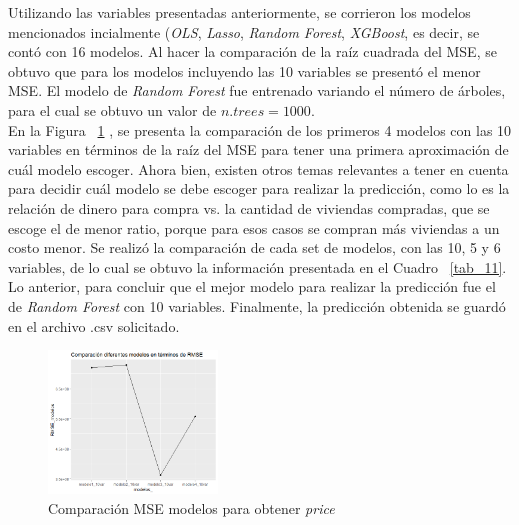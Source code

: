 \documentclass[conference, 10pt]{IEEEtran}
\begin{document}
Utilizando las variables presentadas anteriormente, se corrieron los modelos mencionados incialmente (\textit{OLS}, \textit{Lasso}, \textit{Random Forest}, \textit{XGBoost}, es decir, se contó con 16 modelos. Al hacer la comparación de la raíz cuadrada del MSE, se obtuvo que para los modelos incluyendo las 10 variables se presentó el menor MSE. El modelo de \textit{Random Forest} fue entrenado variando el número de árboles, para el cual se obtuvo un valor de $n.trees=1000$.\\
En la Figura ~\ref{fig_3} , se presenta la comparación de los primeros 4 modelos con las 10 variables en términos de la raíz del MSE para tener una primera aproximación de cuál modelo escoger. Ahora bien, existen otros temas relevantes a tener en cuenta para decidir cuál modelo se debe escoger para realizar la predicción, como lo es la relación de dinero para compra vs. la cantidad de viviendas compradas, que se escoge el de menor ratio, porque para esos casos se compran más viviendas a un costo menor. Se realizó la comparación de cada set de modelos, con las 10, 5 y 6 variables, de lo cual se obtuvo la información presentada en el Cuadro ~\ref{tab_11}. Lo anterior, para concluir que el mejor modelo para realizar la predicción fue el de \textit{Random Forest} con 10 variables. Finalmente, la predicción obtenida se guardó en el archivo .csv solicitado.
\\

\begin{figure}[htbp]
\centerline{\includegraphics[width=0.4\textwidth]{../Vistas/Comp_MSE_modelos_var_10.png}}
\caption{Comparación MSE modelos para obtener \textit{price}}
\label{fig_3}
\end{figure}
\end{document}
